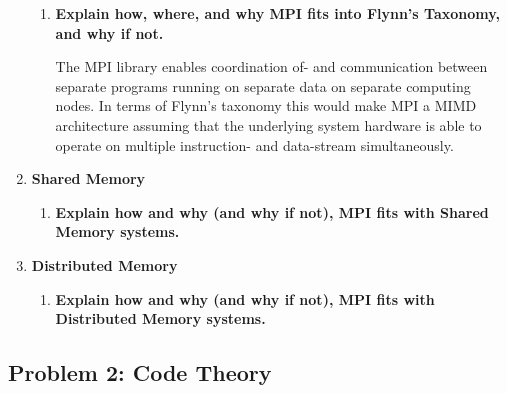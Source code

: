 \begin{enumerate}
\begin{enumerate}

\item \textbf{Explain how, where, and why MPI fits into Flynn's Taxonomy, and why if not.}

The \acf{MPI} library enables coordination of- and communication between separate programs running on separate data on separate computing nodes. In terms of Flynn's taxonomy this would make \ac{MPI} a \ac{MIMD} architecture assuming that the underlying system hardware is able to operate on multiple instruction- and data-stream simultaneously.

\end{enumerate}

\item \textbf{Shared Memory}

\begin{enumerate}

\item \textbf{Explain how and why (and why if not), MPI fits with Shared Memory systems.}

\end{enumerate}

\item \textbf{Distributed Memory}

\begin{enumerate}

\item \textbf{Explain how and why (and why if not), MPI fits with Distributed Memory systems.}

\end{enumerate}

\end{enumerate}

\subsection*{Problem 2: Code Theory}

